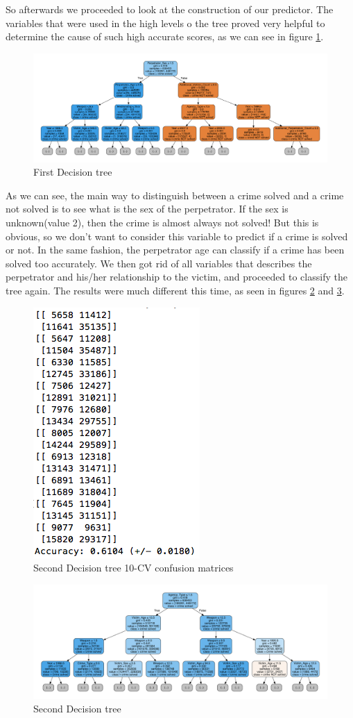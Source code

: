 \documentclass[12pt]{report}
\begin{document}
So afterwards we proceeded to look at the construction of our predictor. The variables that were used in the high levels o the tree proved very helpful to determine the cause of such high accurate scores, as we can see in figure \ref{fig:PDT}.

\begin{figure}[h]
  \centering
  \includegraphics[width=\linewidth]{../Images/PerfectDecisionTree}
  \caption{First Decision tree}
  \label{fig:PDT}
\end{figure}

As we can see, the main way to distinguish between a crime solved and a crime not solved is to see what is the sex of the perpetrator. If the sex is unknown(value 2), then the crime is almost always not solved! But this is obvious, so we don't want to consider this variable to predict if a crime is solved or not. In the same fashion, the perpetrator age can classify if a crime has been solved too accurately.
We then got rid of all variables that describes the perpetrator and his/her relationship to the victim, and proceeded to classify the tree again. The results were much different this time, as seen in figures \ref{fig:RDTCM} and \ref{fig:RDT}.

\begin{figure}[h]
  \centering
  \includegraphics[width=0.25\linewidth]{../Images/RealDecisionTreeCM}
  \caption{Second Decision tree 10-CV confusion matrices}
  \label{fig:RDTCM}
\end{figure}

\begin{figure}[h]
  \centering
  \includegraphics[width=\linewidth]{../Images/RealDecisionTree}
  \caption{Second Decision tree}
  \label{fig:RDT}
\end{figure}
\end{document}

